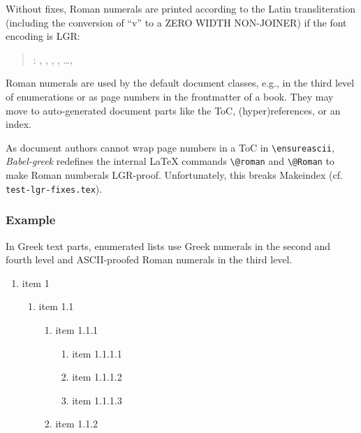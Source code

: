 \documentclass[a4paper]{article}
\newcommand{\file}{\texttt}
\begin{document}
  Without fixes, Roman numerals are printed according to the Latin
  transliteration (including the conversion of ``v'' to a
  ZERO WIDTH NON-JOINER) if the font encoding is LGR:

  \makeatletter
  \newcommand{\RomanNumeralTest}{\f@encoding:
              \romannumeral 1, \romannumeral 2, \romannumeral 3,
              \romannumeral 4, \ldots, }
  \makeatother
  \begin{quote}
    \RomanNumeralTest\\
    \lgrfont{\RomanNumeralTest}
  \end{quote}

  Roman numerals are used by the default document classes, e.g., in the third
  level of enumerations or as page numbers in the frontmatter of a book.
  They may move to auto-generated document parts like the ToC,
  (hyper)references, or an index.

  As document authors cannot wrap page numbers in a ToC in \verb|\ensureascii|,
  \emph{Babel-greek} redefines the internal LaTeX commands \verb|\@roman| and
  \verb|\@Roman| to make Roman numberals LGR-proof.
  Unfortunately, this breaks Makeindex (cf. \file{test-lgr-fixes.tex}).

\fi


\subsubsection{Example}

In Greek text parts, enumerated lists use Greek numerals in the second and
fourth level and ASCII-proofed Roman numerals in the third level.

\begin{enumerate}
  \item item 1
  \begin{enumerate}
    \item item 1.1
    \begin{enumerate}
      \item item 1.1.1
       \begin{enumerate}
         \item item 1.1.1.1
         \item item 1.1.1.2
         \item item 1.1.1.3 \label{item 1.1.1.3}
       \end{enumerate}
      \item item 1.1.2
    \end{enumerate}
  \end{enumerate}
\end{enumerate}
\end{document}
